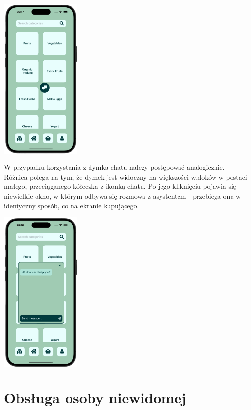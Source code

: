 \begin{center}
    \includegraphics[width=0.3\textwidth]{images/front/cat_chat.png}
\end{center}

W przypadku korzystania z dymka chatu należy postępować analogicznie. Różnica polega na tym, że dymek jest widoczny na większości widoków w postaci małego, przeciąganego kółeczka z ikonką chatu. Po jego kliknięciu pojawia się niewielkie okno, w którym odbywa się rozmowa z asystentem - przebiega ona w identyczny sposób, co na ekranie kupującego. 


\begin{center}
    \includegraphics[width=0.3\textwidth]{images/front/cat_chat_open.png}
\end{center}

\section{Obsługa osoby niewidomej}

